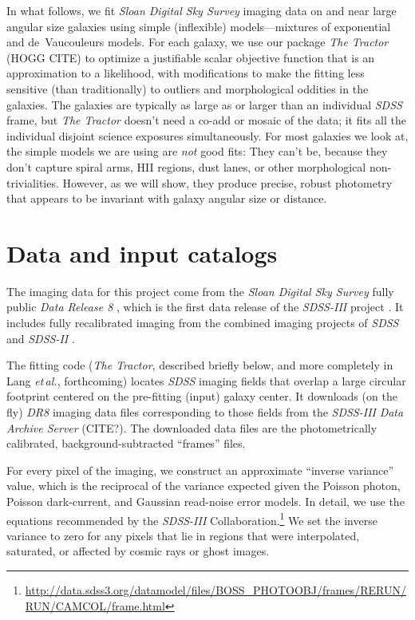 \documentclass[12pt,preprint,pdftex]{aastex}
\newcommand{\foreign}[1]{\emph{#1}}
\newcommand{\etal}{\foreign{et\,al.}}
\newcommand{\project}[1]{\textsl{#1}}
\begin{document}
In what follows, we fit \project{Sloan Digital Sky Survey} imaging
data on and near large angular size galaxies using simple (inflexible)
models---mixtures of exponential and de~Vaucouleurs models.  For each
galaxy, we use our package \project{The Tractor} (HOGG CITE) to
optimize a justifiable scalar objective function that is an
approximation to a likelihood, with modifications to make the fitting
less sensitive (than traditionally) to outliers and morphological
oddities in the galaxies.  The galaxies are typically as large as or
larger than an individual \project{SDSS} frame, but \project{The
  Tractor} doesn't need a co-add or mosaic of the data; it fits all
the individual disjoint science exposures simultaneously.  For most
galaxies we look at, the simple models we are using are \emph{not}
good fits: They can't be, because they don't capture spiral arms, HII
regions, dust lanes, or other morphological non-trivialities.
However, as we will show, they produce precise, robust photometry that
appears to be invariant with galaxy angular size or distance.

\section{Data and input catalogs}

The imaging data for this project come from the \project{Sloan Digital
  Sky Survey} fully public \project{Data Release 8} \citep{dr8}, which is
the first data release of the \project{SDSS-III} project \citep{sdssiii}.  It
includes fully recalibrated imaging \citep{padmanabhan} from the
combined imaging projects of \project{SDSS} \citep{york}  and
\project{SDSS-II} \citep{sdssii}.

The fitting code (\project{The Tractor}, described briefly below, and
more completely in Lang \etal, forthcoming) locates \project{SDSS}
imaging fields that overlap a large circular footprint centered on the
pre-fitting (input) galaxy center.  It downloads (on the fly)
\project{DR8} imaging data files corresponding to those fields from
the \project{SDSS-III} \project{Data Archive Server} (CITE?).  The
downloaded data files are the photometrically calibrated,
background-subtracted ``frames'' files.

For every pixel of the imaging, we construct an approximate ``inverse
variance'' value, which is the reciprocal of the variance expected
given the Poisson photon, Poisson dark-current, and Gaussian
read-noise error models.  In detail, we use the equations recommended
by the \project{SDSS-III}
Collaboration.\footnote{\url{http://data.sdss3.org/datamodel/files/BOSS\_PHOTOOBJ/frames/RERUN/RUN/CAMCOL/frame.html}}
We set the inverse variance to zero for any pixels that lie in regions
that were interpolated, saturated, or affected by cosmic rays or ghost
images.
\end{document}
